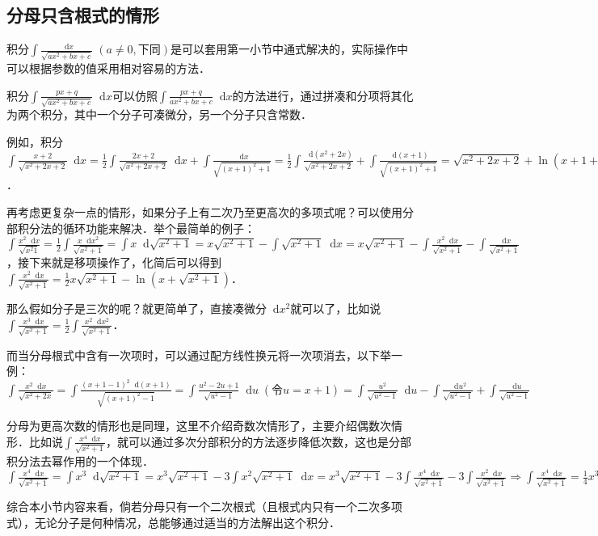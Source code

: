 \documentclass{ctexbook}
\newcommand*{\dif}{\mathop{}\!\mathrm{d}}
\begin{document}
\subsection{分母只含根式的情形}
积分$\int\frac{\dif{x}}{\sqrt{ax^{2}+bx+c}}\;\left(a\ne0,\text{下同}\right)$是可以套用第一小节中通式解决的，实际操作中可以根据参数的值采用相对容易的方法．\par
积分$\int\frac{px+q}{\sqrt{ax^{2}+bx+c}}\dif{x}$可以仿照$\int\frac{px+q}{ax^{2}+bx+c}\dif{x}$的方法进行，通过拼凑和分项将其化为两个积分，其中一个分子可凑微分，另一个分子只含常数．\par
例如，积分$\int\frac{x+2}{\sqrt{x^{2}+2x+2}}\dif{x}=\frac{1}{2}\int\frac{2x+2}{\sqrt{x^{2}+2x+2}}\dif{x}+\int\frac{\dif{x}}{\sqrt{\left(x+1\right)^{2}+1}}=\frac{1}{2}\int\frac{\dif{\left(x^{2}+2x\right)}}{\sqrt{x^{2}+2x+2}}+\int\frac{\dif{\left(x+1\right)}}{\sqrt{\left(x+1\right)^{2}+1}}=\sqrt{x^{2}+2x+2}+\ln{\left(x+1+\sqrt{x^{2}+2x+2}\right)}+C$．\par
再考虑更复杂一点的情形，如果分子上有二次乃至更高次的多项式呢？可以使用分部积分法的循环功能来解决．举个最简单的例子：$\int\frac{x^{2}\dif{x}}{\sqrt{x^{2}1}}=\frac{1}{2}\int\frac{x\dif{x^{2}}}{\sqrt{x^{2}+1}}=\int x\dif{\sqrt{x^{2}+1}}=x\sqrt{x^{2}+1}-\int\sqrt{x^{2}+1}\dif{x}=x\sqrt{x^{2}+1}-\int\frac{x^{2}\dif{x}}{\sqrt{x^{2}+1}}-\int\frac{\dif{x}}{\sqrt{x^{2}+1}}$，接下来就是移项操作了，化简后可以得到$\int\frac{x^{2}\dif{x}}{\sqrt{x^{2}+1}}=\frac{1}{2}x\sqrt{x^{2}+1}-\ln{\left(x+\sqrt{x^{2}+1}\right)}$．\par
那么假如分子是三次的呢？就更简单了，直接凑微分$\dif{x^{2}}$就可以了，比如说$\int\frac{x^{3}\dif{x}}{\sqrt{x^{2}+1}}=\frac{1}{2}\int\frac{x^{2}\dif{x^{2}}}{\sqrt{x^{2}+1}}$．\par
而当分母根式中含有一次项时，可以通过配方线性换元将一次项消去，以下举一例：\\
$\int\frac{x^{2}\dif{x}}{\sqrt{x^{2}+2x}}=\int\frac{\left(x+1-1\right)^{2}\dif{\left(x+1\right)}}{\sqrt{\left(x+1\right)^{2}-1}}=\int\frac{u^{2}-2u+1}{\sqrt{u^{2}-1}}\dif{u}\;\left(\text{令}u=x+1\right)=\int\frac{u^{2}}{\sqrt{u^{2}-1}}\dif{u}-\int\frac{\dif{u^{2}}}{\sqrt{u^{2}-1}}+\int\frac{\dif{u}}{\sqrt{u^{2}-1}}$\par
分母为更高次数的情形也是同理，这里不介绍奇数次情形了，主要介绍偶数次情形．比如说$\int\frac{x^{4}\dif{x}}{\sqrt{x^{2}+1}}$，就可以通过多次分部积分的方法逐步降低次数，这也是分部积分法去幂作用的一个体现．\\
$\int\frac{x^{4}\dif{x}}{\sqrt{x^{2}+1}}=\int x^{3}\dif{\sqrt{x^{2}+1}}=x^{3}\sqrt{x^{2}+1}-3\int x^{2}\sqrt{x^{2}+1}\dif{x}=x^{3}\sqrt{x^{2}+1}-3\int\frac{x^{4}\dif{x}}{\sqrt{x^{2}+1}}-3\int\frac{x^{2}\dif{x}}{\sqrt{x^{2}+1}}\Rightarrow\int\frac{x^{4}\dif{x}}{\sqrt{x^{2}+1}}=\frac{1}{4}x^{3}\sqrt{x^{2}+1}-\frac{3}{4}\int\frac{x^{2}\dif{x}}{\sqrt{x^{2}+1}}$\par
综合本小节内容来看，倘若分母只有一个二次根式（且根式内只有一个二次多项式），无论分子是何种情况，总能够通过适当的方法解出这个积分．\par
\end{document}
